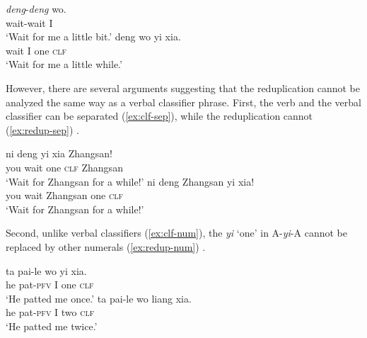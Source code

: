 \ea\label{ex:redup-clf}
	\ea \gll \textit{deng}-\textit{deng} wo.\\
		wait-wait I\\
		\glt `Wait for me a little bit.'
	\ex \gll deng wo yi xia.\\
	wait I one \textsc{clf}\\
	\glt `Wait for me a little while.'
	\z
\z

However, there are several arguments suggesting that the reduplication cannot be analyzed the same way as a verbal classifier phrase. First, the verb and the verbal classifier can be separated (\ref{ex:clf-sep}), while the reduplication cannot (\ref{ex:redup-sep}) \citep[269]{Paris2013}.

\ea\label{ex:clf-sep}
  \ea \gll ni deng yi xia Zhangsan!\\
   you wait one \textsc{clf} Zhangsan\\
   \glt `Wait for Zhangsan for a while!'
  \ex \gll ni deng Zhangsan yi xia!\\
   you wait Zhangsan one \textsc{clf}\\
   \glt `Wait for Zhangsan for a while!'
\z
\z

\ea\label{ex:redup-sep}
\z
\z

Second, unlike verbal classifiers (\ref{ex:clf-num}), the \textit{yi} ‘one’ in A-\textit{yi}-A cannot be replaced by other numerals (\ref{ex:redup-num}) \citep[299--230]{YangWei2017}.

\ea\label{ex:clf-num}
  \ea \gll ta pai-le wo yi xia.\\
   he pat-\textsc{pfv} I one \textsc{clf}\\
   \glt `He patted me once.'
   \ex \gll ta pai-le wo liang xia.\\
    he pat-\textsc{pfv} I two \textsc{clf}\\
    \glt `He patted me twice.'
\z
\z

\ea\label{ex:redup-num}
\z
\z

